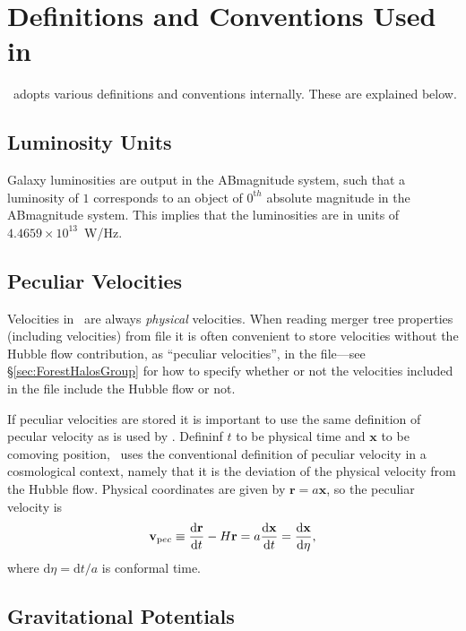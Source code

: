 \chapter{Definitions and Conventions Used in \glc}

\glc\ adopts various definitions and conventions internally. These are explained below.

\section{Luminosity Units}

Galaxy luminosities are output in the \gls{ABmagnitude} system, such that a luminosity of $1$ corresponds to an object of $0^{\mathrm th}$ absolute magnitude in the \gls{ABmagnitude} system. This implies that the luminosities are in units of $4.4659\times 10^{13}$~W/Hz.

\section{Peculiar Velocities}\label{sec:GalacticusVelocityDefinitions}

Velocities in \glc\ are always \emph{physical} velocities. When reading merger tree properties (including velocities) from file it is often convenient to store velocities without the Hubble flow contribution, as ``peculiar velocities'', in the file---see \S\ref{sec:ForestHalosGroup} for how to specify whether or not  the velocities included in the file include the Hubble flow or not.

If peculiar velocities are stored it is important to use the same definition of pecular velocity as is used by \glc. Defininf $t$ to be physical time and ${\mathbf x}$ to be comoving position, \glc\ uses the conventional definition of peculiar velocity in a cosmological context, namely that it is the deviation of the physical velocity from the Hubble flow. Physical coordinates are given by ${\mathbf r} = a{\mathbf x}$, so the peculiar velocity is
\begin{equation}
{\mathbf v}_{\mathrm pec} \equiv {{\mathrm d} {\mathbf r} \over {\mathrm d} t} - H {\mathbf r} = a {{\mathrm d} {\mathbf x}\over{\mathrm d} t} = {{\mathrm d}{\mathbf x}\over{\mathrm d}\eta},
\end{equation}
where ${\mathrm d}\eta = {\mathrm d}t/a$ is conformal time. 

\section{Gravitational Potentials}

